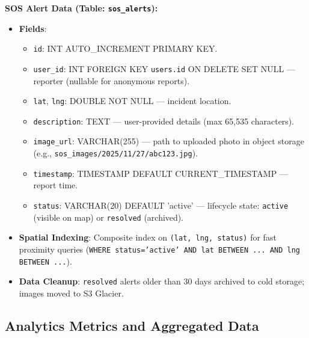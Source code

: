 \textbf{SOS Alert Data (Table: \texttt{sos\_alerts}):}
\begin{itemize}
    \item \textbf{Fields}:
    \begin{itemize}
        \item \texttt{id}: INT AUTO\_INCREMENT PRIMARY KEY.
        \item \texttt{user\_id}: INT FOREIGN KEY \textrightarrow{} \texttt{users.id} ON DELETE SET NULL — reporter (nullable for anonymous reports).
        \item \texttt{lat}, \texttt{lng}: DOUBLE NOT NULL — incident location.
        \item \texttt{description}: TEXT — user-provided details (max 65,535 characters).
        \item \texttt{image\_url}: VARCHAR(255) — path to uploaded photo in object storage (e.g., \texttt{sos\_images/2025/11/27/abc123.jpg}).
        \item \texttt{timestamp}: TIMESTAMP DEFAULT CURRENT\_TIMESTAMP — report time.
        \item \texttt{status}: VARCHAR(20) DEFAULT 'active' — lifecycle state: \texttt{active} (visible on map) or \texttt{resolved} (archived).
    \end{itemize}
    \item \textbf{Spatial Indexing}: Composite index on \texttt{(lat, lng, status)} for fast proximity queries (\texttt{WHERE status='active' AND lat BETWEEN ... AND lng BETWEEN ...}).
    \item \textbf{Data Cleanup}: \texttt{resolved} alerts older than 30 days archived to cold storage; images moved to S3 Glacier.
\end{itemize}

\subsection{Analytics Metrics and Aggregated Data}

